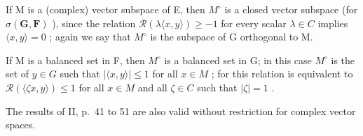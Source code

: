 If M is a (complex) vector subspace of E, then \(M^{\circ}\) is a closed vector subspace (for \(\sigma(\mathbf{G},\mathbf{F})\) ), since the relation \(\mathcal{R}(\lambda\langle x,y\rangle)\geqslant-1\) for every scalar \(\lambda\in C\) implies \(\langle x,y\rangle=0\) ; again we say that \(M^{\circ}\) is the subspace of G orthogonal to M.

If M is a balanced set in F, then \(M^{\circ}\) is a balanced set in G; in this case \(M^{\circ}\) is the set of \(y \in G\) such that \(\left|\langle x, y \rangle\right| \leqslant 1\) for all \(x \in M\) ; for this relation is equivalent to \(\mathcal{R}(\langle \zeta x, y \rangle) \leqslant 1\) for all \(x \in M\) and all \(\zeta \in C\) such that \(|\zeta| = 1\) .

The results of II, p.~41 to 51 are also valid without restriction for complex vector spaces.

\exercisesheading
